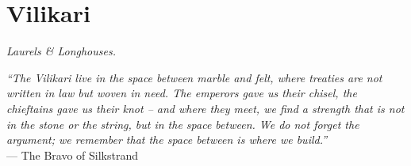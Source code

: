 \documentclass[12pt,oneside]{book}
\begin{document}


\newpage

\chapter{Vilikari}
\emph{Laurels \& Longhouses.}

\noindent
\textit{``The Vilikari live in the space between marble and felt, where treaties are not written in law but woven in need. The emperors gave us their chisel, the chieftains gave us their knot -- and where they meet, we find a strength that is not in the stone or the string, but in the space between. We do not forget the argument; we remember that the space between is where we build.''} \\
--- The Bravo of Silkstrand
\end{document}

